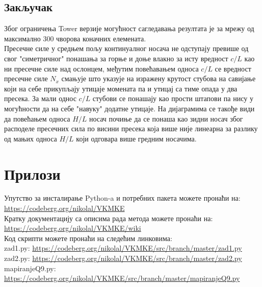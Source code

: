 \documentclass[11pt, a4paper]{article}
\begin{document}
\subsection{Закључак}
Због ограничења Tower верзије могућност сагледавања резултата је за мрежу од максимално 300 чворова коначних елемената.\\
Пресечне силе у средњем пољу континуалног носача не одступају превише од свог "симетричног" понашања за горње и доње влакно за исту вредност $c/L$ као ни пресечне силе над ослонцем, међутим повећавањем односа $c/L$ се вредност пресечне силе $N_x$ смањује што указује на изражену крутост стубова на савијање који на себе прикупљају утицаје момената па и утицај са тиме опада у два пресека. За мали однос $c/L$ стубови се понашају као прости штапови па нису у могућности да на себе "навуку" додатне утицаје. 
На дијаграмима се такође види да повећањем односа $H/L$ носач почиње да се понаша као зидни носач због расподеле пресечних сила по висини пресека која више није линеарна за разлику од мањих односа $H/L$ који одговара више гредним носачима.
\newpage
\section{Прилози}
Упутство за инсталирање Python-a и потребних пакета можете пронаћи на:
\url{https://codeberg.org/nikolal/VKMKE}\\
Кратку документацију са описима рада метода можете пронаћи на:
\url{https://codeberg.org/nikolal/VKMKE/wiki}\\
Код скрипти можете пронаћи на следећим линковима:\\
zad1.py: \url{https://codeberg.org/nikolal/VKMKE/src/branch/master/zad1.py}
zad2.py: \url{https://codeberg.org/nikolal/VKMKE/src/branch/master/zad2.py}\\
mapiranjeQ9.py: \url{https://codeberg.org/nikolal/VKMKE/src/branch/master/mapiranjeQ9.py}
\newpage
{}
\printbibliography
\end{document}
